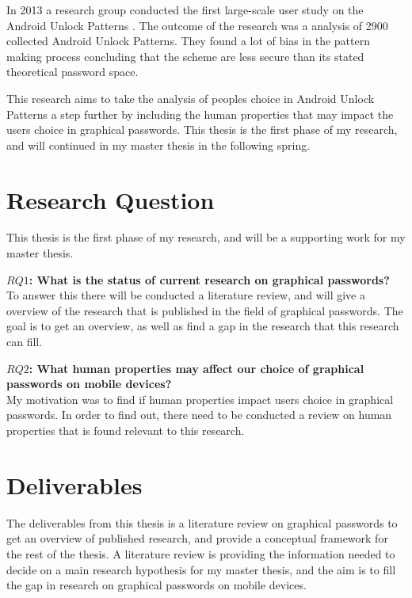   In 2013 a research group conducted the first large-scale user study on the Android Unlock Patterns \cite{Uellenbeck}. The outcome of the research was a analysis of 2900 collected Android Unlock Patterns. They found a lot of bias in the pattern making process concluding that the scheme are less secure than its stated theoretical password space. 

  This research aims to take the analysis of peoples choice in Android Unlock Patterns a step further by including the human properties that may impact the users choice in graphical passwords. This thesis is the first phase of my research, and will continued in my master thesis in the following spring. 

  \section{Research Question}
    
    This thesis is the first phase of my research, and will be a supporting work for my master thesis. 

    {\bf $RQ1$: What is the status of current research on graphical passwords?} \\
    To answer this there will be conducted a literature review, and will give a overview of the research that is published in the field of graphical passwords. The goal is to get an overview, as well as find a gap in the research that this research can fill. 

    {\bf $RQ2$: What human properties may affect our choice of graphical passwords on mobile devices?}\\
    My motivation was to find if human properties impact users choice in graphical passwords. In order to find out, there need to be conducted a review on human properties that is found relevant to this research. 

  \section{Deliverables}

    The deliverables from this thesis is a literature review on graphical passwords to get an overview of published research, and provide a conceptual framework for the rest of the thesis. A literature review is providing the information needed to decide on a main research hypothesis for my master thesis, and the aim is to fill the gap in research on graphical passwords on mobile devices.

